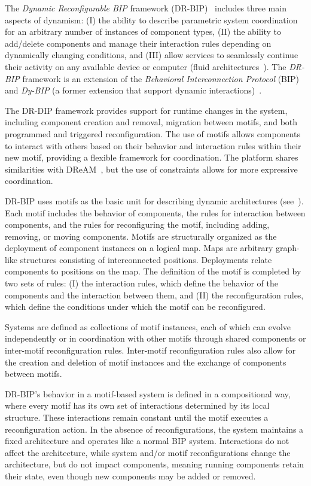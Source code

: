 The \emph{Dynamic Reconfigurable BIP} framework (DR-BIP)~\cite{10.1007/978-3-030-03424-5_20} includes three main aspects of dynamism: (I) the ability
to describe parametric system coordination for an arbitrary number of instances of component types, (II) the ability to add/delete components and
manage their interaction rules depending on dynamically changing conditions, and (III) allow services to seamlessly continue their activity on any
available device or computer (fluid architectures~\cite{taivalsaari2014liquid}).
The \emph{DR-BIP} framework is an extension of the \emph{Behavioral Interconnection Protocol} (BIP)~\cite{5719588} and
\emph{Dy-BIP} (a former extension that support dynamic interactions)~\cite{10.1007/978-3-642-30564-1_1}.

The DR-DIP framework provides support for runtime changes in the system, including component creation and removal, migration between motifs, and both
programmed and triggered reconfiguration.
The use of motifs allows components to interact with others based on their behavior and interaction rules within their new
motif, providing a flexible framework for coordination. The platform shares similarities with DReAM~\cite{de2020dream}, but the use of constraints
allows for more expressive coordination.

DR-BIP uses motifs as the basic unit for describing dynamic architectures (see~). Each motif includes the behavior of
components, the rules for interaction between components, and the rules for reconfiguring the motif, including adding, removing, or moving components.
Motifs are structurally organized as the deployment of component instances on a logical map.
Maps are arbitrary graph-like structures consisting of interconnected positions. Deployments relate components to positions on the map.
The definition of the motif is completed by two sets of rules: (I) the interaction rules, which define the behavior of the components and the
interaction between them, and (II) the reconfiguration rules, which define the conditions under which the motif can be reconfigured.

Systems are defined as collections of motif instances, each of which can evolve independently or in coordination with other motifs through shared
components or inter-motif reconfiguration rules. Inter-motif reconfiguration rules also allow for the creation and deletion of motif instances and
the exchange of components between motifs.

DR-BIP's behavior in a motif-based system is defined in a compositional way, where every motif has its own set of interactions determined by its
local structure. These interactions remain constant until the motif executes a reconfiguration action. In the absence of reconfigurations, the system
maintains a fixed architecture and operates like a normal BIP system. Interactions do not affect the architecture, while system and/or motif
reconfigurations change the architecture, but do not impact components, meaning running components retain their state, even though new components may
be added or removed.


